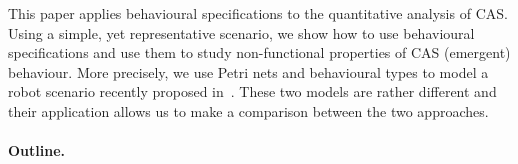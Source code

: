 This paper applies behavioural specifications to the quantitative
analysis of CAS.
%
Using a simple, yet representative scenario, we show how to use
behavioural specifications and use them to study non-functional
properties of CAS (emergent) behaviour.
%
More precisely, we use Petri nets and behavioural types to model a
robot scenario recently proposed in~\cite{itt20}.
%
These two models are rather different and their application allows
us to make a comparison between the two approaches.

\paragraph{Outline.} \eMcomm[todo]{}


